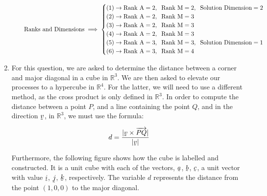 \documentclass[a4paper]{article}
\begin{document}
\begin{enumerate}[label=\textbf{\arabic*.}]
\begin{enumerate}
				$$
				\text{Ranks and Dimensions} \implies
				\begin{cases}
				(1) \rightarrow \text{Rank A} = 2, \hspace{2mm} \text{Rank M} = 2, \hspace{2mm} \text{Solution Dimension} = 2\\
				(2) \rightarrow \text{Rank A} = 2, \hspace{2mm} \text{Rank M} = 3\\
				(3) \rightarrow \text{Rank A} = 2, \hspace{2mm} \text{Rank M} = 3\\
				(4) \rightarrow \text{Rank A} = 2, \hspace{2mm} \text{Rank M} = 3\\
				(5) \rightarrow \text{Rank A} = 3, \hspace{2mm} \text{Rank M} = 3, \hspace{2mm} \text{Solution Dimension} = 1\\
				(6) \rightarrow \text{Rank A} = 3, \hspace{2mm} \text{Rank M} = 4\\
				\end{cases}
				$$


			\end{enumerate}

\bigbreak
\bigbreak

	\item For this question, we are asked to determine the distance between a corner and major diagonal in a cube in $\mathbb{R}^3$. We are then asked to elevate our processes to a hypercube in $\mathbb{R}^4$. For the latter, we will need to use a different method, as the cross product is only defined in $\mathbb{R}^3$. In order to compute the distance between a point $P$, and a line containing the point $Q$, and in the direction $\underaccent{\tilde}{v}$, in $\mathbb{R}^3$, we must use the formula:

	$$
	d = \frac{|\underaccent{\tilde}{v}\times\overrightarrow{PQ}|}{|\underaccent{\tilde}{v}|}
	$$ 

	Furthermore, the following figure shows how the cube is labelled and constructed. It is a unit cube with each of the vectors, $\underaccent{\tilde}{a}$, $\underaccent{\tilde}{b}$, $\underaccent{\tilde}{c}$, a unit vector with value $\underaccent{\tilde}{i}$, $\underaccent{\tilde}{j}$, $\underaccent{\tilde}{k}$, respectively. The variable $d$ represents the distance from the point $(1,0,0)$ to the major diagonal.



\end{enumerate}
\end{document}
